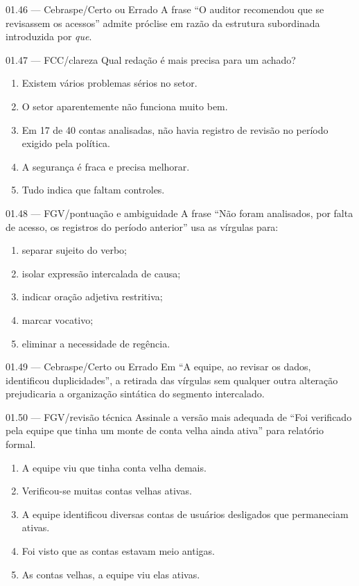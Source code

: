 \begin{questao}{ 01.46 — Cebraspe/Certo ou Errado}
A frase ``O auditor recomendou que se revisassem os acessos'' admite próclise em razão da estrutura subordinada introduzida por \emph{que}.
\end{questao}

\begin{questao}{ 01.47 — FCC/clareza}
Qual redação é mais precisa para um achado?
\begin{enumerate}[label=\Alph*)]
\item Existem vários problemas sérios no setor.
\item O setor aparentemente não funciona muito bem.
\item Em 17 de 40 contas analisadas, não havia registro de revisão no período exigido pela política.
\item A segurança é fraca e precisa melhorar.
\item Tudo indica que faltam controles.
\end{enumerate}
\end{questao}

\begin{questao}{ 01.48 — FGV/pontuação e ambiguidade}
A frase ``Não foram analisados, por falta de acesso, os registros do período anterior'' usa as vírgulas para:
\begin{enumerate}[label=\Alph*)]
\item separar sujeito do verbo;
\item isolar expressão intercalada de causa;
\item indicar oração adjetiva restritiva;
\item marcar vocativo;
\item eliminar a necessidade de regência.
\end{enumerate}
\end{questao}

\begin{questao}{ 01.49 — Cebraspe/Certo ou Errado}
Em ``A equipe, ao revisar os dados, identificou duplicidades'', a retirada das vírgulas sem qualquer outra alteração prejudicaria a organização sintática do segmento intercalado.
\end{questao}

\begin{questao}{ 01.50 — FGV/revisão técnica}
Assinale a versão mais adequada de ``Foi verificado pela equipe que tinha um monte de conta velha ainda ativa'' para relatório formal.
\begin{enumerate}[label=\Alph*)]
\item A equipe viu que tinha conta velha demais.
\item Verificou-se muitas contas velhas ativas.
\item A equipe identificou diversas contas de usuários desligados que permaneciam ativas.
\item Foi visto que as contas estavam meio antigas.
\item As contas velhas, a equipe viu elas ativas.
\end{enumerate}
\end{questao}